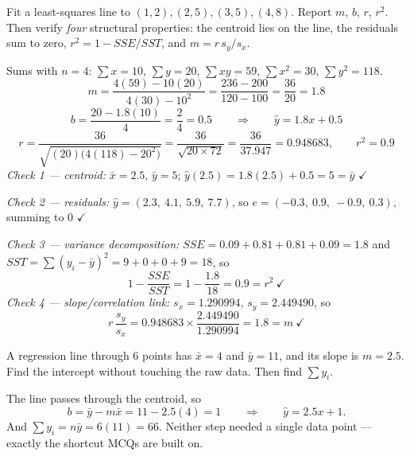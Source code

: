 \begin{probbox}
 Fit a least-squares line to $(1,2),(2,5),(3,5),(4,8)$. Report $m$, $b$, $r$, $r^2$. Then verify \emph{four} structural properties: the centroid lies on the line, the residuals sum to zero, $r^2 = 1-SSE/SST$, and $m = r\,s_y/s_x$.

\ans Sums with $n=4$: $\sum x = 10$, $\sum y = 20$, $\sum xy = 59$, $\sum x^2 = 30$, $\sum y^2 = 118$.
\[
m = \frac{4(59)-10(20)}{4(30)-10^2} = \frac{236-200}{120-100} = \frac{36}{20} = 1.8
\]
\[
b = \frac{20-1.8(10)}{4} = \frac{2}{4} = 0.5 \qquad\Rightarrow\qquad \hat y = 1.8x+0.5
\]
\[
r = \frac{36}{\sqrt{(20)\big(4(118)-20^2\big)}} = \frac{36}{\sqrt{20\times72}} = \frac{36}{37.947} = 0.948683,\qquad r^2 = 0.9
\]
\emph{Check 1 --- centroid:} $\bar x = 2.5$, $\bar y = 5$; $\hat y(2.5) = 1.8(2.5)+0.5 = 5 = \bar y$ $\checkmark$

\emph{Check 2 --- residuals:} $\hat y = (2.3,\ 4.1,\ 5.9,\ 7.7)$, so $e = (-0.3,\ 0.9,\ -0.9,\ 0.3)$, summing to $0$ $\checkmark$

\emph{Check 3 --- variance decomposition:} $SSE = 0.09+0.81+0.81+0.09 = 1.8$ and $SST = \sum(y_i-\bar y)^2 = 9+0+0+9 = 18$, so
\[
1 - \frac{SSE}{SST} = 1-\frac{1.8}{18} = 0.9 = r^2 \ \checkmark
\]
\emph{Check 4 --- slope/correlation link:} $s_x = 1.290994$, $s_y = 2.449490$, so
\[
r\,\frac{s_y}{s_x} = 0.948683\times\frac{2.449490}{1.290994} = 1.8 = m \ \checkmark
\]

 A regression line through 6 points has $\bar x = 4$ and $\bar y = 11$, and its slope is $m = 2.5$. Find the intercept without touching the raw data. Then find $\sum y_i$.

\ans The line passes through the centroid, so
\[
b = \bar y - m\bar x = 11-2.5(4) = 1 \qquad\Rightarrow\qquad \hat y = 2.5x+1 .
\]
And $\sum y_i = n\bar y = 6(11) = 66$. Neither step needed a single data point --- exactly the shortcut MCQs are built on.
\end{probbox}

